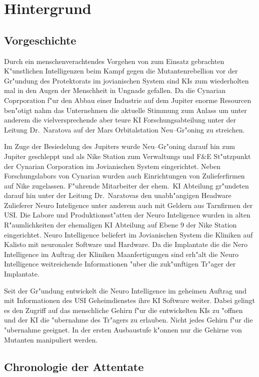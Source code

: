 \section{Hintergrund}

\subsection{Vorgeschichte}

Durch ein menschenverachtendes Vorgehen von zum Einsatz gebrachten K"unstlichen Intelligenzen beim Kampf gegen die Mutantenrebellion vor der Gr"undung des Protektorats im jovianischen System sind KIs zum wiederholten mal in den Augen der Menschheit in Ungnade gefallen. Da die Cynarian Coprporation f"ur den Abbau einer Industrie auf dem Jupiter enorme Resourcen ben"otigt nahm das Unternehmen die aktuelle Stimmung zum Anlass um unter anderem die vielversprechende aber teure KI Forschungsabteilung unter der Leitung Dr.~Naratova auf der Mars Orbitalstation Neu--Gr"oning zu streichen.

Im Zuge der Besiedelung des Jupiters wurde Neu--Gr"oning darauf hin zum Jupiter geschleppt und als Nike Station zum Verwaltungs und F\&E St"utzpunkt der Cynarian Corporation im Jovianischen System eingerichtet. Neben Forschungslabors von Cynarian wurden auch Einrichtungen von Zulieferfirmen auf Nike zugelassen. F"uhrende Mitarbeiter der ehem.~KI Abteilung gr"undeten darauf hin unter der Leitung Dr.~Naratovas den unabh"angigen Headware Zulieferer Neuro Inteligence unter anderem auch mit Geldern aus Tarnfirmen der USI. Die Labore und Produktionsst"atten der Neuro Inteligence wurden in alten R"aumlichkeiten der ehemaligen KI Abteilung auf Ebene 9 der Nike Station eingerichtet. Neuro Intelligence beliefert im Jovianischen System die Kliniken auf Kalisto mit neuronaler Software und Hardware. Da die Implantate die die Nero Intelligence im Auftrag der Kliniken Ma\3anfertigungen sind erh"alt die Neuro Intelligence weitreichende Informationen "uber die zuk"unftigen Tr"ager der Implantate.

Seit der Gr"undung entwickelt die Neuro Intelligence im geheimen Auftrag und mit Informationen des USI Geheimdienstes ihre KI Software weiter. Dabei gelingt es den Zugriff auf das menschliche Gehirn f"ur die entwickelten KIs zu "offnen und der KI die "ubernahme des Tr"agers zu erlauben. Nicht jedes Gehirn f"ur die "ubernahme geeignet. In der ersten Ausbaustufe k"onnen nur die Gehirne von Mutanten manipuliert werden.

\subsection{Chronologie der Attentate}


